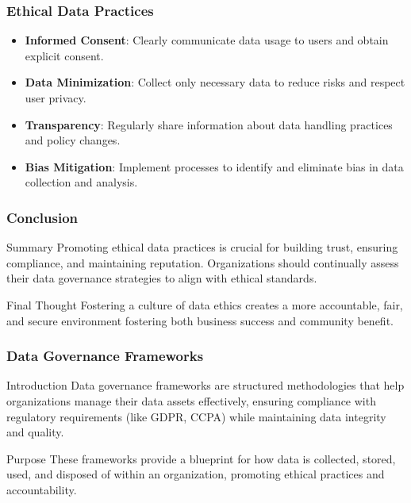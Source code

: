 \documentclass{beamer}
\begin{document}
\begin{frame}[fragile]
    \frametitle{Ethical Data Practices}
    \begin{itemize}
        \item \textbf{Informed Consent}: Clearly communicate data usage to users and obtain explicit consent.
        
        \item \textbf{Data Minimization}: Collect only necessary data to reduce risks and respect user privacy.
        
        \item \textbf{Transparency}: Regularly share information about data handling practices and policy changes.
        
        \item \textbf{Bias Mitigation}: Implement processes to identify and eliminate bias in data collection and analysis.
    \end{itemize}
\end{frame}

\begin{frame}[fragile]
    \frametitle{Conclusion}
    \begin{block}{Summary}
        Promoting ethical data practices is crucial for building trust, ensuring compliance, and maintaining reputation. Organizations should continually assess their data governance strategies to align with ethical standards.
    \end{block}
    \begin{block}{Final Thought}
        Fostering a culture of data ethics creates a more accountable, fair, and secure environment fostering both business success and community benefit.
    \end{block}
\end{frame}

\begin{frame}[fragile]
    \frametitle{Data Governance Frameworks}
    \begin{block}{Introduction}
        Data governance frameworks are structured methodologies that help organizations manage their data assets effectively, ensuring compliance with regulatory requirements (like GDPR, CCPA) while maintaining data integrity and quality.
    \end{block}
    \begin{block}{Purpose}
        These frameworks provide a blueprint for how data is collected, stored, used, and disposed of within an organization, promoting ethical practices and accountability.
    \end{block}
\end{frame}
\end{document}
